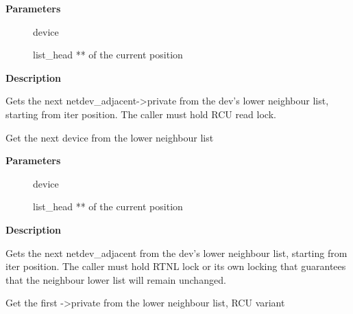 \documentclass[a4paper,8pt,english]{sphinxmanual}
\begin{document}
\textbf{Parameters}
\begin{description}
\item[{}] \leavevmode
device

\item[{}] \leavevmode
list\_head ** of the current position

\end{description}

\textbf{Description}

Gets the next netdev\_adjacent-\textgreater{}private from the dev's lower neighbour
list, starting from iter position. The caller must hold RCU read lock.

\begin{fulllineitems}
\label{networking/kapi:c.netdev_lower_get_next}
Get the next device from the lower neighbour list

\end{fulllineitems}


\textbf{Parameters}
\begin{description}
\item[{}] \leavevmode
device

\item[{}] \leavevmode
list\_head ** of the current position

\end{description}

\textbf{Description}

Gets the next netdev\_adjacent from the dev's lower neighbour
list, starting from iter position. The caller must hold RTNL lock or
its own locking that guarantees that the neighbour lower
list will remain unchanged.

\begin{fulllineitems}
\label{networking/kapi:c.netdev_lower_get_first_private_rcu}
Get the first -\textgreater{}private from the lower neighbour list, RCU variant

\end{fulllineitems}
\end{document}
